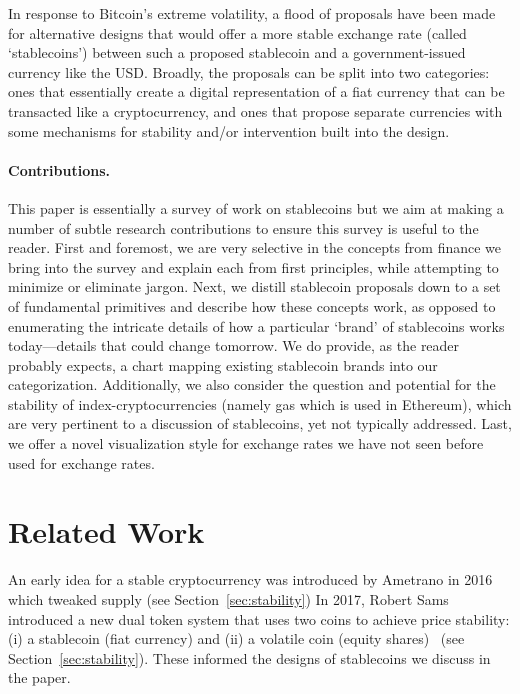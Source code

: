 In response to Bitcoin's extreme volatility, a flood of proposals have been made for alternative designs that would offer a more stable exchange rate (called `stablecoins') between such a proposed stablecoin and a government-issued currency like the USD. Broadly, the proposals can be split into two categories: ones that essentially create a digital representation of a fiat currency that can be transacted like a cryptocurrency, and ones that propose separate currencies with some mechanisms for stability and/or intervention built into the design.

\paragraph{Contributions.} This paper is essentially a survey of work on stablecoins but we aim at making a number of subtle research contributions to ensure this survey is useful to the reader. First and foremost, we are very selective in the concepts from finance we bring into the survey and explain each from first principles, while attempting to minimize or eliminate jargon. Next, we distill stablecoin proposals down to a set of fundamental primitives and describe how these concepts work, as opposed to enumerating the intricate details of how a particular `brand' of stablecoins works today---details that could change tomorrow. We do provide, as the reader probably expects, a chart mapping existing stablecoin brands into our categorization. Additionally, we also consider the question and potential for the stability of index-cryptocurrencies (namely gas which is used in Ethereum), which are very pertinent to a discussion of stablecoins, yet not typically addressed. Last, we offer a novel visualization style for exchange rates we have not seen before used for exchange rates.



\section{Related Work}
\label{sec:lit}

An early idea for a stable cryptocurrency was introduced by Ametrano in 2016~\cite{ametrano2016hayek} which tweaked supply (see Section~\ref{sec:stability}) In 2017, Robert Sams introduced a new dual token system that uses two coins to achieve price stability: (i) a stablecoin (\eg fiat currency) and (ii) a volatile coin (\eg equity shares)~\cite{sams2015note} (see Section~\ref{sec:stability}). These informed the designs of stablecoins we discuss in the paper.

